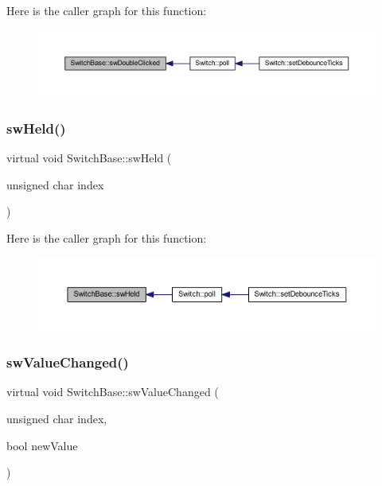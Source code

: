 Here is the caller graph for this function\+:
\nopagebreak
\begin{figure}[H]
\begin{center}
\leavevmode
\includegraphics[width=350pt]{d8/d8e/class_switch_base_a120bac96086b295783809866e3afd390_icgraph}
\end{center}
\end{figure}
\mbox{\label{class_switch_base_a074fca26f56e9253ddd86720f7840440}} 
\subsubsection{\texorpdfstring{sw\+Held()}{swHeld()}}
{\footnotesize\ttfamily virtual void Switch\+Base\+::sw\+Held (\begin{DoxyParamCaption}\item[{unsigned char}]{index }\end{DoxyParamCaption})\hspace{0.3cm}{\ttfamily [pure virtual]}}

Here is the caller graph for this function\+:
\nopagebreak
\begin{figure}[H]
\begin{center}
\leavevmode
\includegraphics[width=350pt]{d8/d8e/class_switch_base_a074fca26f56e9253ddd86720f7840440_icgraph}
\end{center}
\end{figure}
\mbox{\label{class_switch_base_a8dce83329bd9ce69e55d2f01115f3593}} 
\subsubsection{\texorpdfstring{sw\+Value\+Changed()}{swValueChanged()}}
{\footnotesize\ttfamily virtual void Switch\+Base\+::sw\+Value\+Changed (\begin{DoxyParamCaption}\item[{unsigned char}]{index,  }\item[{bool}]{new\+Value }\end{DoxyParamCaption})\hspace{0.3cm}{\ttfamily [pure virtual]}}

